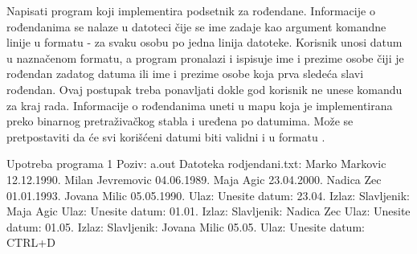 \begin{Exercise}[label=706, difficulty=1]
Napisati program koji implementira podsetnik za rođendane. Informacije o rođendanima se nalaze u datoteci čije se ime zadaje kao argument komandne linije u formatu  - za svaku osobu po jedna linija datoteke. Korisnik unosi datum u naznačenom formatu, a program pronalazi i ispisuje ime i prezime osobe čiji je rođendan zadatog datuma ili ime i prezime osobe koja prva sledeća slavi rođendan. Ovaj postupak treba ponavljati dokle god korisnik ne unese komandu za kraj rada. Informacije o rođendanima uneti u mapu koja je implementirana preko binarnog pretraživačkog stabla i uređena po datumima. Može se pretpostaviti da će svi korišćeni datumi biti validni i u formatu .
\begin{maxitest}
\begin{test}{Upotreba programa 1}
Poziv: a.out
Datoteka rodjendani.txt:
	Marko Markovic 12.12.1990.
	Milan Jevremovic 04.06.1989.
	Maja Agic 23.04.2000.
	Nadica Zec 01.01.1993.
	Jovana Milic 05.05.1990.
Ulaz:
	Unesite datum: 23.04.
Izlaz:
	Slavljenik: Maja Agic 
Ulaz:	
	Unesite datum: 01.01.
Izlaz:
	Slavljenik: Nadica Zec
Ulaz:
	Unesite datum: 01.05.
Izlaz:	
	Slavljenik: Jovana Milic 05.05.
Ulaz:	
	Unesite datum: CTRL+D
\end{test}
\end{maxitest}
\end{Exercise}

\begin{Answer}[ref=706]
\end{Answer}



